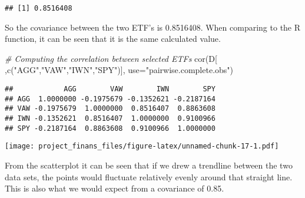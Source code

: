 \documentclass[
]{article}
\newenvironment{Shaded}{\begin{snugshade}}{\end{snugshade}}
\newcommand{\AttributeTok}[1]{\textcolor[rgb]{0.77,0.63,0.00}{#1}}
\newcommand{\CommentTok}[1]{\textcolor[rgb]{0.56,0.35,0.01}{\textit{#1}}}
\newcommand{\FloatTok}[1]{\textcolor[rgb]{0.00,0.00,0.81}{#1}}
\newcommand{\FunctionTok}[1]{\textcolor[rgb]{0.00,0.00,0.00}{#1}}
\newcommand{\NormalTok}[1]{#1}
\newcommand{\OtherTok}[1]{\textcolor[rgb]{0.56,0.35,0.01}{#1}}
\newcommand{\SpecialCharTok}[1]{\textcolor[rgb]{0.00,0.00,0.00}{#1}}
\newcommand{\StringTok}[1]{\textcolor[rgb]{0.31,0.60,0.02}{#1}}
\begin{document}
\begin{verbatim}
## [1] 0.8516408
\end{verbatim}

So the covariance between the two ETF's is 0.8516408. When comparing to
the R function, it can be seen that it is the same calculated value.

\begin{Shaded}
\begin{Highlighting}[]
\CommentTok{\# Computing the correlation between selected ETF\textquotesingle{}s}
\FunctionTok{cor}\NormalTok{(D[ ,}\FunctionTok{c}\NormalTok{(}\StringTok{"AGG"}\NormalTok{,}\StringTok{"VAW"}\NormalTok{,}\StringTok{"IWN"}\NormalTok{,}\StringTok{"SPY"}\NormalTok{)], }\AttributeTok{use=}\StringTok{"pairwise.complete.obs"}\NormalTok{)}
\end{Highlighting}
\end{Shaded}

\begin{verbatim}
##            AGG        VAW        IWN        SPY
## AGG  1.0000000 -0.1975679 -0.1352621 -0.2187164
## VAW -0.1975679  1.0000000  0.8516407  0.8863608
## IWN -0.1352621  0.8516407  1.0000000  0.9100966
## SPY -0.2187164  0.8863608  0.9100966  1.0000000
\end{verbatim}

\begin{Shaded}
\end{Shaded}

\texttt{[image: project\_finans\_files/figure-latex/unnamed-chunk-17-1.pdf]}

From the scatterplot it can be seen that if we drew a trendline between
the two data sets, the points would fluctuate relatively evenly around
that straight line. This is also what we would expect from a covariance
of 0.85.
\end{document}
